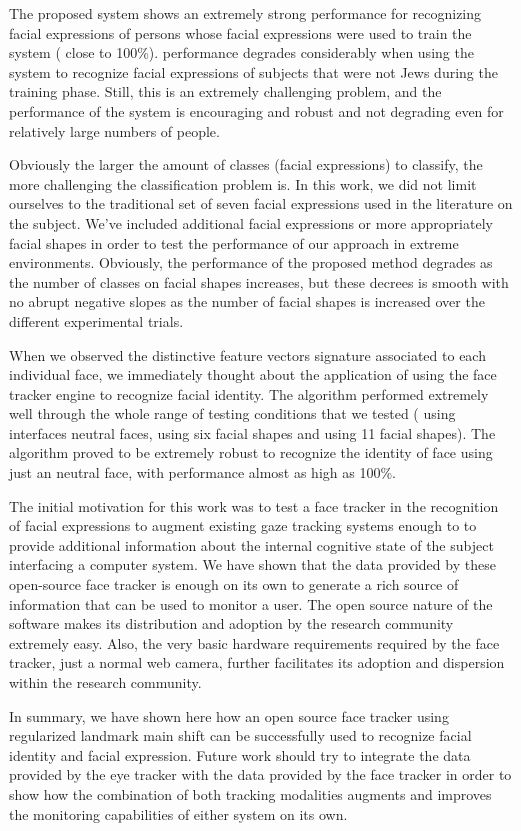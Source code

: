 \documentclass[]{article}
\begin{document}
The proposed system shows an extremely strong performance for recognizing facial expressions of persons whose facial
expressions were used to train the system ( close to 100\%). performance degrades considerably when using the system to
recognize facial expressions of subjects that were not Jews during the training phase. Still, this is an extremely
challenging problem, and the performance of the system is encouraging and robust and not degrading even for relatively
large numbers of people.


Obviously the larger the amount of classes (facial expressions) to classify, the more challenging the
classification problem is. In this work, we did not limit ourselves to the traditional set  of seven facial expressions
used in the literature on the subject. We've included additional facial expressions or more appropriately facial shapes
in order to test the performance of our approach in extreme environments. Obviously, the performance of the proposed
method degrades as the number of classes  on facial shapes increases, but these decrees is smooth with no abrupt
negative slopes as the number of facial shapes is increased over the different experimental trials.


When we observed the distinctive feature vectors signature associated to each individual face, we immediately thought
about the application of using the face tracker engine to recognize facial identity. The algorithm performed extremely
well  through the whole range of testing conditions that we tested ( using interfaces neutral faces, using six facial
shapes and using 11 facial shapes). The algorithm proved to be extremely robust to recognize the identity of face using
just an neutral face, with performance  almost as high as 100\%.

The initial motivation for this work was to test a face tracker in the recognition of facial expressions  to augment
existing gaze tracking systems enough to to provide additional information about the internal cognitive state of the
subject interfacing a computer system. We have shown that the data provided by these open-source face tracker is enough
on its own to generate a rich source of information that can be used to monitor a user. The open source nature of the
software makes its distribution and adoption by the research community extremely easy. Also, the very basic hardware
requirements required by the face tracker, just a normal web camera, further facilitates its adoption and dispersion
within the research community. 


In summary, we have shown here how an open source face tracker using regularized landmark main shift can be successfully
used to recognize facial identity and facial expression. Future work should try to integrate the data provided by the
eye tracker with the data provided by the face tracker in order to show how the combination of both tracking modalities
augments and improves the monitoring capabilities of either system on its own.







\end{document}
